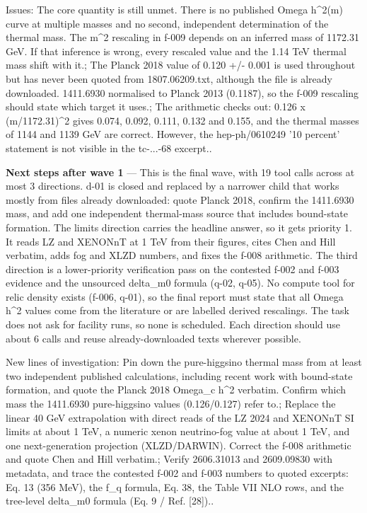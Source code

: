 \documentclass[11pt,a4paper]{article}
\begin{document}
Issues: The core quantity is still unmet. There is no published Omega h\textasciicircum{}2(m) curve at multiple masses and no second, independent determination of the thermal mass. The m\textasciicircum{}2 rescaling in f-009 depends on an inferred mass of 1172.31 GeV. If that inference is wrong, every rescaled value and the 1.14 TeV thermal mass shift with it.; The Planck 2018 value of 0.120 +/- 0.001 is used throughout but has never been quoted from 1807.06209.txt, although the file is already downloaded. 1411.6930 normalised to Planck 2013 (0.1187), so the f-009 rescaling should state which target it uses.; The arithmetic checks out: 0.126 x (m/1172.31)\textasciicircum{}2 gives 0.074, 0.092, 0.111, 0.132 and 0.155, and the thermal masses of 1144 and 1139 GeV are correct. However, the hep-ph/0610249 '10 percent' statement is not visible in the tc-...-68 excerpt..

\textbf{Next steps after wave 1} --- This is the final wave, with 19 tool calls across at most 3 directions. d-01 is closed and replaced by a narrower child that works mostly from files already downloaded: quote Planck 2018, confirm the 1411.6930 mass, and add one independent thermal-mass source that includes bound-state formation. The limits direction carries the headline answer, so it gets priority 1. It reads LZ and XENONnT at 1 TeV from their figures, cites Chen and Hill verbatim, adds fog and XLZD numbers, and fixes the f-008 arithmetic. The third direction is a lower-priority verification pass on the contested f-002 and f-003 evidence and the unsourced delta\_m0 formula (q-02, q-05). No compute tool for relic density exists (f-006, q-01), so the final report must state that all Omega h\textasciicircum{}2 values come from the literature or are labelled derived rescalings. The task does not ask for facility runs, so none is scheduled. Each direction should use about 6 calls and reuse already-downloaded texts wherever possible.

New lines of investigation: Pin down the pure-higgsino thermal mass from at least two independent published calculations, including recent work with bound-state formation, and quote the Planck 2018 Omega\_c h\textasciicircum{}2 verbatim. Confirm which mass the 1411.6930 pure-higgsino values (0.126/0.127) refer to.; Replace the linear 40 GeV extrapolation with direct reads of the LZ 2024 and XENONnT SI limits at about 1 TeV, a numeric xenon neutrino-fog value at about 1 TeV, and one next-generation projection (XLZD/DARWIN). Correct the f-008 arithmetic and quote Chen and Hill verbatim.; Verify 2606.31013 and 2609.09830 with metadata, and trace the contested f-002 and f-003 numbers to quoted excerpts: Eq. 13 (356 MeV), the f\_q formula, Eq. 38, the Table VII NLO rows, and the tree-level delta\_m0 formula (Eq. 9 / Ref. [28])..
\end{document}
